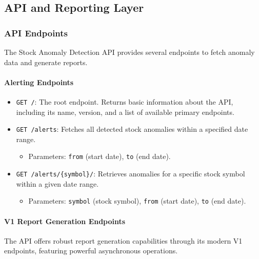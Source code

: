 \break





\subsection{API and Reporting Layer}
\subsubsection{API Endpoints}
The Stock Anomaly Detection API provides several endpoints to fetch anomaly data and generate reports.

\paragraph{Alerting Endpoints}
\begin{itemize}
    \item \verb|GET /|: The root endpoint. Returns basic information about the API, including its name, version, and a list of available primary endpoints.
    \item \verb|GET /alerts|: Fetches all detected stock anomalies within a specified date range.
    \begin{itemize}
        \item Parameters: \verb|from| (start date), \verb|to| (end date).
    \end{itemize}
    \item \verb|GET /alerts/{symbol}/|: Retrieves anomalies for a specific stock symbol within a given date range.
    \begin{itemize}
        \item Parameters: \verb|symbol| (stock symbol), \verb|from| (start date), \verb|to| (end date).
    \end{itemize}
\end{itemize}

\paragraph{V1 Report Generation Endpoints}
The API offers robust report generation capabilities through its modern V1 endpoints, featuring powerful asynchronous operations.

